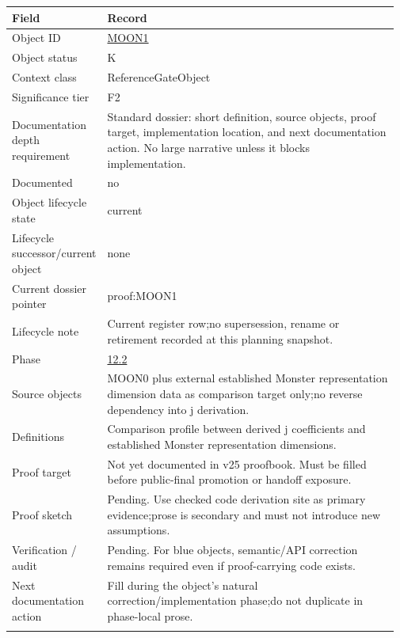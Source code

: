\begin{longtable}{L{0.16\linewidth} L{0.81\linewidth}}
\hline
\textbf{Field} & \textbf{Record}\\
\hline
Object ID & \hyperlink{object-row-MOON1}{MOON1}\\
\hline\addlinespace[0.20em]
Object status & K\\
\hline\addlinespace[0.20em]
Context class & ReferenceGateObject\\
\hline\addlinespace[0.20em]
Significance tier & F2\\
\hline\addlinespace[0.20em]
Documentation depth requirement & Standard dossier: short definition, source objects, proof target, implementation location, and next documentation action. No large narrative unless it blocks implementation.\\
\hline\addlinespace[0.20em]
Documented & no\\
\hline\addlinespace[0.20em]
Object lifecycle state & current\\
\hline\addlinespace[0.20em]
Lifecycle successor/\allowbreak{}current object & none\\
\hline\addlinespace[0.20em]
Current dossier pointer & proof:MOON1\\
\hline\addlinespace[0.20em]
Lifecycle note & Current register row;\newline no supersession, rename or retirement recorded at this planning snapshot.\\
\hline\addlinespace[0.20em]
Phase & \hyperlink{phase-row-12-2}{12.2}\\
\hline\addlinespace[0.20em]
Source objects & MOON0 plus external established Monster representation dimension data as comparison target only;\newline no reverse dependency into j derivation.\\
\hline\addlinespace[0.20em]
Definitions & Comparison profile between derived j coefficients and established Monster representation dimensions.\\
\hline\addlinespace[0.20em]
Proof target & Not yet documented in v25 proofbook. Must be filled before public-final promotion or handoff exposure.\\
\hline\addlinespace[0.20em]
Proof sketch & Pending. Use checked code derivation site as primary evidence;\newline prose is secondary and must not introduce new assumptions.\\
\hline\addlinespace[0.20em]
Verification /\allowbreak{} audit & Pending. For blue objects, semantic/\allowbreak{}API correction remains required even if proof-carrying code exists.\\
\hline\addlinespace[0.20em]
Next documentation action & Fill during the object's natural correction/\allowbreak{}implementation phase;\newline do not duplicate in phase-local prose.\\
\hline\addlinespace[0.20em]
\end{longtable}
